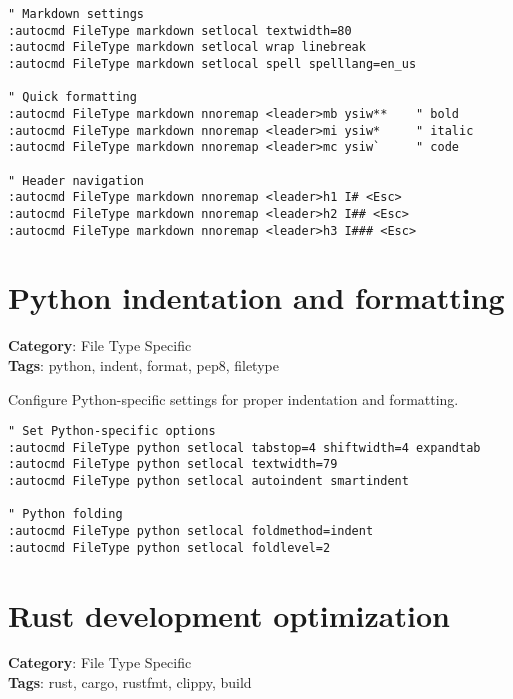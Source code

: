{{{{{\begin{Exa*}{}
\begin{Verbatim}[fontsize=\footnotesize, breaklines, breakanywhere]
" Markdown settings
:autocmd FileType markdown setlocal textwidth=80
:autocmd FileType markdown setlocal wrap linebreak
:autocmd FileType markdown setlocal spell spelllang=en_us

" Quick formatting
:autocmd FileType markdown nnoremap <leader>mb ysiw**    " bold
:autocmd FileType markdown nnoremap <leader>mi ysiw*     " italic
:autocmd FileType markdown nnoremap <leader>mc ysiw`     " code

" Header navigation
:autocmd FileType markdown nnoremap <leader>h1 I# <Esc>
:autocmd FileType markdown nnoremap <leader>h2 I## <Esc>
:autocmd FileType markdown nnoremap <leader>h3 I### <Esc>
\end{Verbatim}
\end{Exa*}

\section{Python indentation and formatting}

\textbf{Category}: File Type Specific\\ \textbf{Tags}: python, indent, format, pep8, filetype
\vspace{0.5cm}

Configure Python-specific settings for proper indentation and formatting.

\begin{Exa*}{}
\begin{Verbatim}[fontsize=\footnotesize, breaklines, breakanywhere]
" Set Python-specific options
:autocmd FileType python setlocal tabstop=4 shiftwidth=4 expandtab
:autocmd FileType python setlocal textwidth=79
:autocmd FileType python setlocal autoindent smartindent

" Python folding
:autocmd FileType python setlocal foldmethod=indent
:autocmd FileType python setlocal foldlevel=2
\end{Verbatim}
\end{Exa*}

\section{Rust development optimization}

\textbf{Category}: File Type Specific\\ \textbf{Tags}: rust, cargo, rustfmt, clippy, build
\vspace{0.5cm}

}}}}}
